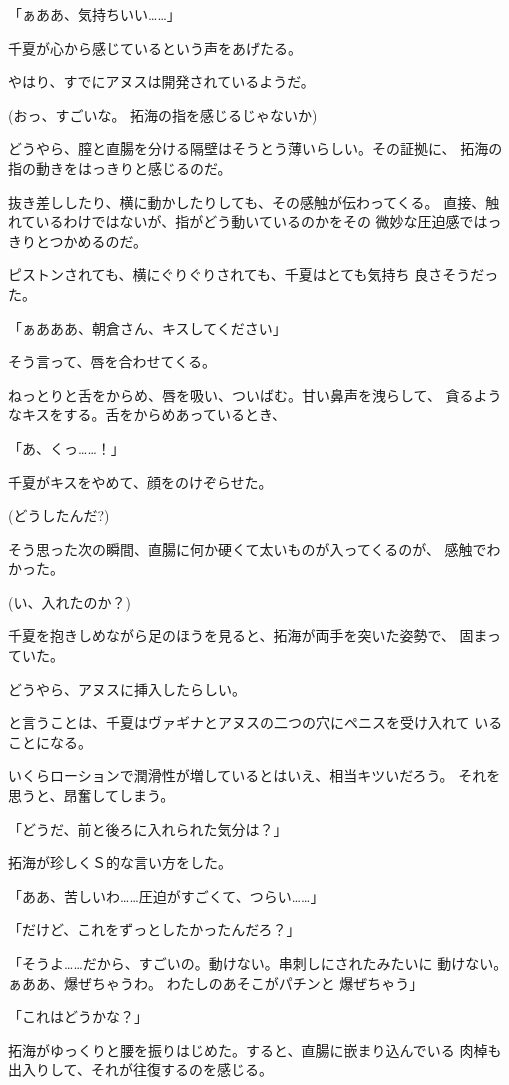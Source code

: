 ﻿\documentclass[
    book,tate,
    line_length=30zw,
    jafontsize=12pt,
    paper=b5j,
    landscape,
    ]{jlreq}
\begin{document}
「ぁああ、気持ちいい……」

千夏が心から感じているという声をあげたる。

やはり、すでにアヌスは開発されているようだ。

(おっ、すごいな。 拓海の指を感じるじゃないか)

どうやら、膣と直腸を分ける隔壁はそうとう薄いらしい。その証拠に、
拓海の指の動きをはっきりと感じるのだ。

抜き差ししたり、横に動かしたりしても、その感触が伝わってくる。
直接、触れているわけではないが、指がどう動いているのかをその
微妙な圧迫感ではっきりとつかめるのだ。

ピストンされても、横にぐりぐりされても、千夏はとても気持ち
良さそうだった。

「ぁあああ、朝倉さん、キスしてください」

そう言って、唇を合わせてくる。

ねっとりと舌をからめ、唇を吸い、ついばむ。甘い鼻声を洩らして、
貪るようなキスをする。舌をからめあっているとき、

「あ、くっ……！」

千夏がキスをやめて、顔をのけぞらせた。

(どうしたんだ?)

そう思った次の瞬間、直腸に何か硬くて太いものが入ってくるのが、
感触でわかった。

(い、入れたのか？)

千夏を抱きしめながら足のほうを見ると、拓海が両手を突いた姿勢で、
固まっていた。

どうやら、アヌスに挿入したらしい。

と言うことは、千夏はヴァギナとアヌスの二つの穴にペニスを受け入れて
いることになる。

いくらローションで潤滑性が増しているとはいえ、相当キツいだろう。
それを思うと、昂奮してしまう。

「どうだ、前と後ろに入れられた気分は？」

拓海が珍しくＳ的な言い方をした。

「ああ、苦しいわ……圧迫がすごくて、つらい……」

「だけど、これをずっとしたかったんだろ？」

「そうよ……だから、すごいの。動けない。串刺しにされたみたいに
動けない。ぁああ、爆ぜちゃうわ。 わたしのあそこがパチンと
爆ぜちゃう」

「これはどうかな？」

拓海がゆっくりと腰を振りはじめた。すると、直腸に嵌まり込んでいる
肉棹も出入りして、それが往復するのを感じる。
\end{document}
